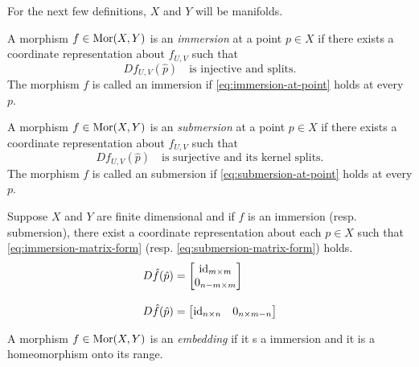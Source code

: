 \documentclass[../main-v2-manifolds.tex]{subfiles}
\begin{document}
%
%
For the next few definitions, $X$ and $Y$ will be manifolds.
\begin{definition}[Immersion]\label{def:immersion}
    A morphism $f\in\operatorname{Mor}(X,Y)$ is an \emph{immersion} at a point $p\in X$ if there exists a coordinate representation about $f_{U,V}$ such that 
    \begin{equation}\label{eq:immersion-at-point}
        Df_{U,V}(\hat{p})\quad\text{is injective and splits.}
    \end{equation}
    The morphism $f$ is called an immersion if \cref{eq:immersion-at-point} holds at every $p$.
\end{definition}
%
%
\begin{definition}[Submersion]\label{def:submersion}
    A morphism $f\in\operatorname{Mor}(X,Y)$ is an \emph{submersion} at a point $p\in X$ if there exists a coordinate representation about $f_{U,V}$ such that 
    \begin{equation}\label{eq:submersion-at-point}
        Df_{U,V}(\hat{p})\quad\text{is surjective and its kernel splits.}
    \end{equation}
    The morphism $f$ is called an submersion if \cref{eq:submersion-at-point} holds at every $p$.
\end{definition}
%
%
%
\begin{remark}
    Suppose $X$ and $Y$ are finite dimensional and if $f$ is an immersion (resp. submersion), there exist a coordinate representation about each $p\in X$ such that \cref{eq:immersion-matrix-form} (resp. \cref{eq:submersion-matrix-form}) holds.
    \begin{align}
        D\hat{f}(\hat{p}) &= \begin{bmatrix}
            \operatorname{id}_{m\times m} \\
            0_{n-m\times m} 
        \end{bmatrix}\label{eq:immersion-matrix-form}\\[2ex]
    D\hat{f}(\hat{p}) &= 
        \begin{bmatrix}
            \operatorname{id}_{n\times n} & 0_{n\times m-n}
        \end{bmatrix}\label{eq:submersion-matrix-form}
    \end{align}
\end{remark}    
%
%
%
\begin{definition}[Embedding]\label{def:embedding}
    A morphism $f\in\operatorname{Mor}(X,Y)$ is an \emph{embedding} if it s a immersion and it is a homeomorphism onto its range.
\end{definition}
\end{document}
